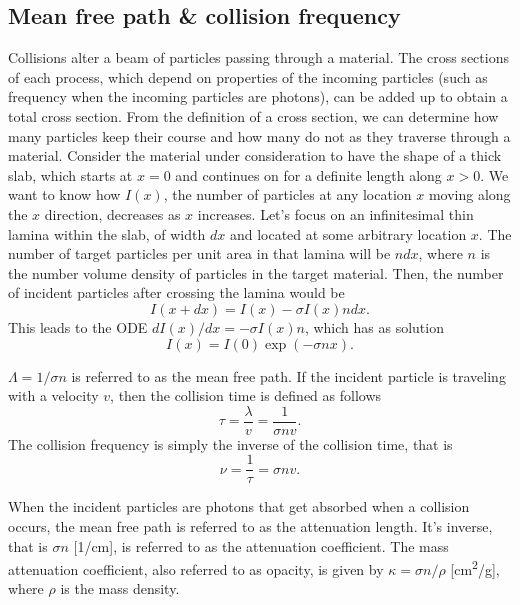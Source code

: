 \documentclass[a4paper,11pt]{report}
\begin{document}
\subsection{Mean free path \& collision frequency}
Collisions alter a beam of particles passing through a material. The cross sections of each process, which depend on properties of the incoming particles (such as frequency when the incoming particles are photons), can be added up to obtain a total cross section. From the definition of a cross section, we can determine how many particles keep their course and how many do not as they traverse through a material. Consider the material under consideration to have the shape of a thick slab, which starts at $x=0$ and continues on for a definite length along $x>0$. We want to know how $I(x)$, the number of particles at any location $x$ moving along the $x$ direction, decreases as $x$ increases. Let's focus on an infinitesimal thin lamina within the slab, of width $dx$ and located at some arbitrary location $x$. The number of target particles per unit area in that lamina will be $n dx$, where $n$ is the number volume density of particles in the target material. Then, the number of incident particles after crossing the lamina would be
\begin{equation}
    I(x+dx) = I(x) -\sigma I(x) n dx.
\end{equation}
This leads to the ODE $dI(x)/dx = -\sigma I(x) n$, which has as solution
\begin{equation}
    I(x) = I(0) \exp(-\sigma n x).
\end{equation}

$\Lambda = 1 / \sigma n$ is referred to as the mean free path. If the incident particle is traveling with a velocity $v$, then the collision time is defined as follows
\begin{equation}
    \tau = \frac{\lambda}{v} = \frac{1}{\sigma n v}.
\end{equation}
The collision frequency is simply the inverse of the collision time, that is
\begin{equation}
    \nu = \frac{1}{\tau} = \sigma n v.
\end{equation}

When the incident particles are photons that get absorbed when a collision occurs, the mean free path is referred to as the attenuation length. It's inverse, that is $\sigma n$ [1/cm], is referred to as the attenuation coefficient. The mass attenuation coefficient, also referred to as opacity, is given by $\kappa = \sigma n / \rho$ [cm\textsuperscript{2}/g], where $\rho$ is the mass density.
\end{document}

